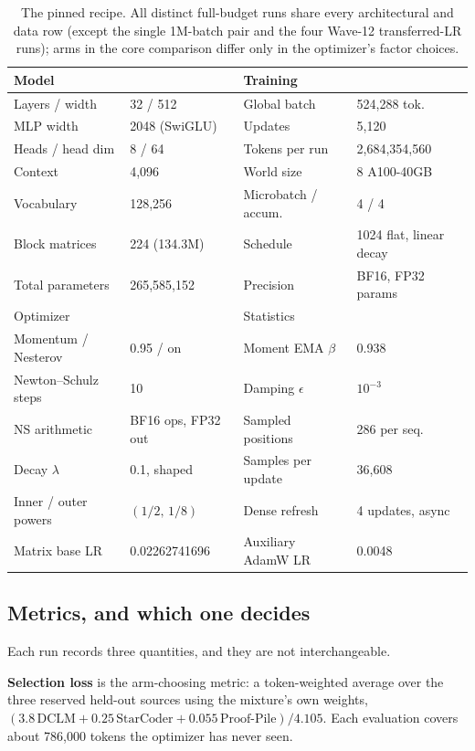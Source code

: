 \begin{table}[t]
\centering
\caption{The pinned recipe. All \nDistinctRuns{} distinct full-budget runs share
every architectural and data row (except the single 1M-batch pair and the four
Wave-12 transferred-LR runs); arms in the core comparison differ only in the
optimizer's factor choices.}
\label{tab:recipe}
\footnotesize\setlength{\tabcolsep}{6.0pt}
\begin{tabular}{llll}
\toprule
Model & & Training & \\
\midrule
Layers / width & 32 / 512 & Global batch & 524{,}288 tok. \\
MLP width & 2048 (SwiGLU) & Updates & 5{,}120 \\
Heads / head dim & 8 / 64 & Tokens per run & 2{,}684{,}354{,}560 \\
Context & 4{,}096 & World size & 8 A100-40GB \\
Vocabulary & 128{,}256 & Microbatch / accum. & 4 / 4 \\
Block matrices & 224 (134.3M) & Schedule & 1024 flat, linear decay \\
Total parameters & 265{,}585{,}152 & Precision & BF16, FP32 params \\
\addlinespace
Optimizer & & Statistics & \\
\midrule
Momentum / Nesterov & 0.95 / on & Moment EMA $\beta$ & 0.938 \\
Newton--Schulz steps & 10 & Damping $\epsilon$ & $10^{-3}$ \\
NS arithmetic & BF16 ops, FP32 out & Sampled positions & 286 per seq. \\
Decay $\lambda$ & 0.1, shaped & Samples per update & 36{,}608 \\
Inner / outer powers & $(1/2,\,1/8)$ & Dense refresh & 4 updates, async \\
Matrix base LR & 0.02262741696 & Auxiliary AdamW LR & 0.0048 \\
\bottomrule
\end{tabular}
\end{table}

\subsection{Metrics, and which one decides}

Each run records three quantities, and they are not interchangeable.

\textbf{Selection loss} is the arm-choosing metric: a token-weighted average
over the three reserved held-out sources using the mixture's own weights,
$(3.8\,\text{DCLM}+0.25\,\text{StarCoder}+0.055\,\text{Proof-Pile})/4.105$.
Each evaluation covers about 786{,}000 tokens the optimizer has never seen.

